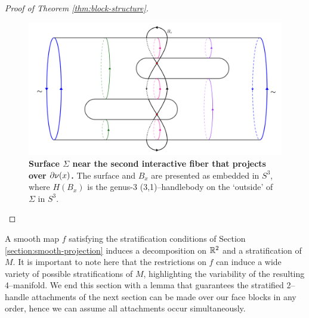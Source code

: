 \begin{proof}[Proof of Theorem \ref{thm:block-structure}]
	\begin{figure}[h!]
		\centering
		\includegraphics[width=\textwidth]{figures/codim-2-surface-2.png}
		\caption{
			\textbf{Surface $\Sigma$ near the second interactive fiber that projects over $\partial\nu(x)$.}
			The surface and $B_x$ are presented as embedded in $S^3$, where $H(B_x)$ is the genus-3 (3,1)--handlebody on the `outside' of $\Sigma$ in $S^3$.
		}
		\label{fig:codim-2-surface-2}
	\end{figure}


\end{proof}

A smooth map $f$ satisfying the stratification conditions of Section \ref{section:smooth-projection} induces a decomposition on $\mathbb{R}^2$ and a stratification of $M$.
It is important to note here that the restrictions on $f$ can induce a wide variety of possible stratifications of $M$, highlighting the variability of the resulting 4--manifold.
We end this section with a lemma that guarantees the stratified 2--handle attachments of the next section can be made over our face blocks in any order, hence we can assume all attachments occur simultaneously.


